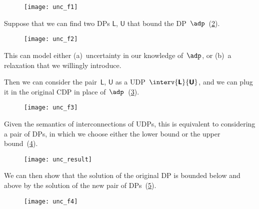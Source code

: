 \begin{figure}[h!]
    \texttt{[image: unc\_f1]}
    \caption{}
    \label{fig:consider1}
\end{figure}

Suppose that we can find two DPs $\boldsymbol{\mathsf{L}}$, $\boldsymbol{\mathsf{U}}$ that bound the DP~$\adp$~(\cref{fig:consider2}).

\begin{figure}[h!]
    \texttt{[image: unc\_f2]}
    \caption{}
    \label{fig:consider2}
\end{figure}

This can model either (a)~uncertainty in our knowledge of~$\adp$, or (b)~a relaxation that we willingly introduce.

Then we can consider the pair~$\boldsymbol{\mathsf{L}}$,
$\boldsymbol{\mathsf{U}}$ as a UDP~$\interv {\boldsymbol{\mathsf{L}}} {\boldsymbol{\mathsf{U}}}$,
and we can plug it in the original CDP in place of~$\adp$~(\cref{fig:luinside}).

\begin{figure}[h!]
    \texttt{[image: unc\_f3]}
    \caption{}
    \label{fig:luinside}
\end{figure}

Given the semantics of interconnections of UDPs, this is equivalent to considering a pair of DPs, in which we choose either the lower bound or the upper bound~(\cref{fig:pair}).

\begin{figure}[h!]
    \texttt{[image: unc\_result]}
    \caption{}
    \label{fig:pair}
\end{figure}

We can then show that the solution of the original DP is bounded below and above by the solution of the new pair of DPs~(\cref{fig:domin}).

\begin{figure}[h!]
    \texttt{[image: unc\_f4]}
    \caption{}
    \label{fig:domin}
\end{figure}

